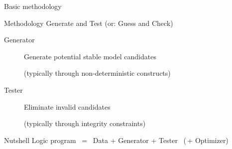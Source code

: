 \begin{frame}[c]{Basic methodology}

\begin{block}{Methodology}
\Large \alert{Generate} and \alert{Test} \quad (or: Guess and Check)
\end{block}

\medskip

\begin{description}
\item[Generator] Generate potential stable model candidates

  (typically through non-deterministic constructs)
\item[Tester] Eliminate invalid candidates

  (typically through integrity constraints)
\end{description}

\pause
\medskip

\begin{block}{Nutshell}
  \smallskip\large
  Logic program \ = \ Data + Generator + Tester \ (\,+ Optimizer)
  \smallskip
\end{block}
\end{frame}
%
